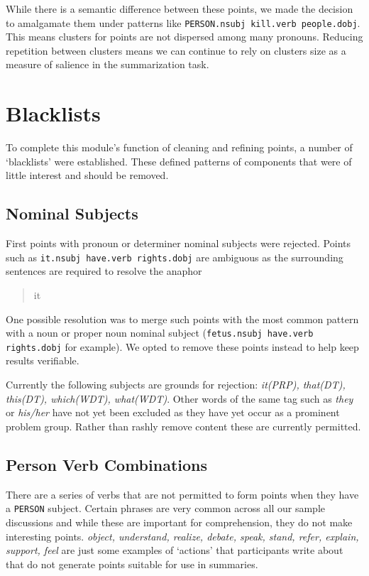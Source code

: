     While there is a semantic difference between these points, we made the decision to amalgamate them under patterns like \texttt{PERSON.nsubj kill.verb people.dobj}. This means clusters for points are not dispersed among many pronouns. Reducing repetition between clusters means we can continue to rely on clusters size as a measure of salience in the summarization task.

  \section{Blacklists}
    To complete this module's function of cleaning and refining points, a number of `blacklists' were established. These defined patterns of components that were of little interest and should be removed.

    \tocless\subsection{Nominal Subjects}
    First points with pronoun or determiner nominal subjects were rejected. Points such as \texttt{it.nsubj have.verb rights.dobj} are ambiguous as the surrounding sentences are required to resolve the anaphor \blockquote{it}. One possible resolution was to merge such points with the most common pattern with a noun or proper noun nominal subject (\texttt{fetus.nsubj have.verb rights.dobj} for example). We opted to remove these points instead to help keep results verifiable.

      Currently the following subjects are grounds for rejection: \textit{it(PRP), that(DT), this(DT), which(WDT), what(WDT)}. Other words of the same tag such as \textit{they} or \textit{his/her} have not yet been excluded as they have yet occur as a prominent problem group. Rather than rashly remove content these are currently permitted.

    \tocless\subsection{Person Verb Combinations}
      There are a series of verbs that are not permitted to form points when they have a \texttt{PERSON} subject. Certain phrases are very common across all our sample discussions and while these are important for comprehension, they do not make interesting points. \textit{object, understand, realize, debate, speak, stand, refer, explain, support, feel} are just some examples of `actions' that participants write about that do not generate points suitable for use in summaries.


